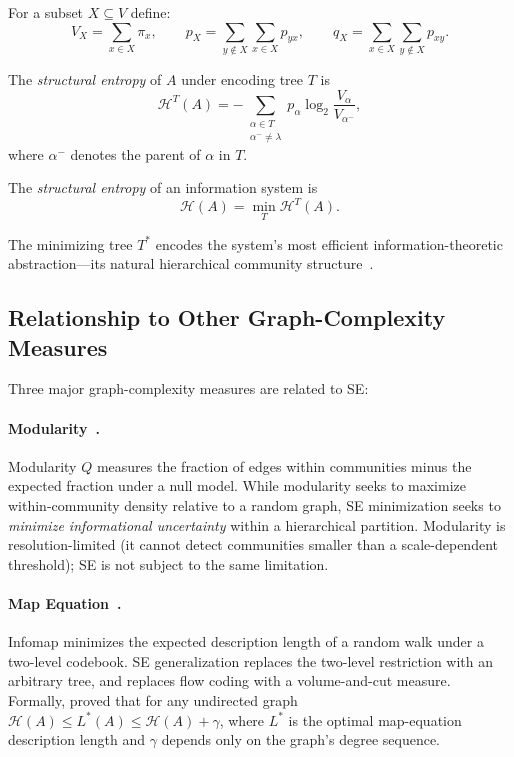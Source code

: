 For a subset $X\subseteq V$ define:
\[
  V_X = \sum_{x\in X}\pi_x, \qquad
  p_X = \sum_{y\notin X}\sum_{x\in X}p_{yx}, \qquad
  q_X = \sum_{x\in X}\sum_{y\notin X}p_{xy}.
\]

\begin{definition}
\label{def:se-tree}
The \emph{structural entropy} of $A$ under encoding tree $T$ is
\[
  \mathcal{H}^T(A)
  = -\sum_{\substack{\alpha\in T\\\alpha^-\neq\lambda}}
    p_\alpha\log_2\frac{V_\alpha}{V_{\alpha^-}},
\]
where $\alpha^-$ denotes the parent of $\alpha$ in $T$.
\end{definition}

\begin{definition}
\label{def:se-system}
The \emph{structural entropy} of an information system is
\[
  \mathcal{H}(A) = \min_T \mathcal{H}^T(A).
\]
\end{definition}

The minimizing tree $T^*$ encodes the system's most efficient
information-theoretic abstraction---its natural hierarchical community
structure~\cite{Li2016}.

\subsection{Relationship to Other Graph-Complexity Measures}
\label{subsec:relations}

Three major graph-complexity measures are related to SE:

\paragraph{Modularity~\cite{newman2004findingmodularity}.}
Modularity $Q$ measures the fraction of edges within communities minus the
expected fraction under a null model.
While modularity seeks to maximize within-community density relative to a
random graph, SE minimization seeks to \emph{minimize informational
uncertainty} within a hierarchical partition.
Modularity is resolution-limited (it cannot detect communities smaller than a
scale-dependent threshold); SE is not subject to the same limitation.

\paragraph{Map Equation~\cite{rosvall2008maps}.}
Infomap minimizes the expected description length of a random walk under a
two-level codebook.
SE generalization replaces the two-level restriction with an arbitrary tree,
and replaces flow coding with a volume-and-cut measure.
Formally, \cite{liu2022similaritygap} proved that for any undirected graph
$\mathcal{H}(A) \le L^*(A) \le \mathcal{H}(A) + \gamma$, where $L^*$ is the
optimal map-equation description length and $\gamma$ depends only on the
graph's degree sequence.

